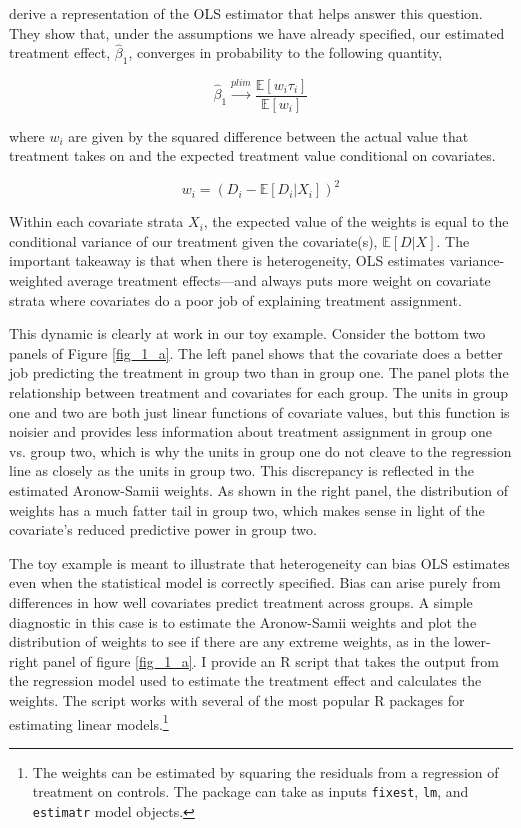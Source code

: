 \documentclass[hidelinks,11pt]{article}
\begin{document}
\citet{aronowsamii2016} derive a representation of the OLS estimator that helps answer this question. They show that, under the assumptions we have already specified, our estimated treatment effect, $\hat \beta_1$, converges in probability to the following quantity,

$$\hat \beta_1 \overset{plim}{\to} \frac{\mathbb{E}[w_i\tau_i]}{\mathbb{E}[w_i]} $$

where $w_i$ are given by the squared difference between the actual value that treatment takes on and the expected treatment value conditional on covariates.

$$w_i = (D_i - \mathbb{E}[D_i|X_i])^2$$

Within each covariate strata $X_i$, the expected value of the weights is equal to the conditional variance of our treatment given the covariate(s), $\mathbb{E}[D|X]$. The important takeaway is that when there is heterogeneity, OLS estimates variance-weighted average treatment effects---and always puts more weight on covariate strata where covariates do a poor job of explaining treatment assignment.

This dynamic is clearly at work in our toy example. Consider the bottom two panels of Figure \ref{fig_1_a}. The left panel shows that the covariate does a better job predicting the treatment in group two than in group one. The panel plots the relationship between treatment and covariates for each group. The units in group one and two are both just linear functions of covariate values, but this function is noisier and provides less information about treatment assignment in group one vs. group two, which is why the units in group one do not cleave to the regression line as closely as the units in group two. This discrepancy is reflected in the estimated Aronow-Samii weights. As shown in the right panel, the distribution of weights has a much fatter tail in group two, which makes sense in light of the covariate's reduced predictive power in group two.

The toy example is meant to illustrate that heterogeneity can bias OLS estimates even when the statistical model is correctly specified. Bias can arise purely from differences in how well covariates predict treatment across groups. A simple diagnostic in this case is to estimate the Aronow-Samii weights and plot the distribution of weights to see if there are any extreme weights, as in the lower-right panel of figure \ref{fig_1_a}. I provide an R script that takes the output from the regression model used to estimate the treatment effect and calculates the weights. The script works with several of the most popular R packages for estimating linear models.\footnote{The weights can be estimated by squaring the residuals from a regression of treatment on controls. The package can take as inputs \texttt{fixest}, \texttt{lm}, and \texttt{estimatr} model objects.}
\end{document}

